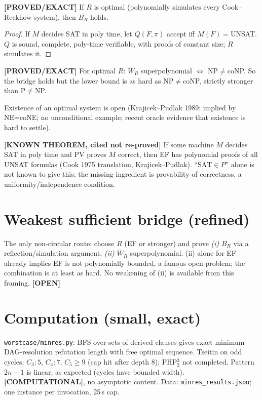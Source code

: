 \documentclass[11pt]{article}
\newcommand{\SAT}{\mathrm{SAT}}\newcommand{\status}[1]{\textbf{[#1]}}
\begin{document}
\begin{proposition} \status{PROVED/EXACT}
If $R$ is optimal (polynomially simulates every Cook--Reckhow system), then $B_R$ holds.
\end{proposition}
\begin{proof} If $M$ decides SAT in poly time, let $Q(F,\pi)$ accept iff $M(F)=$UNSAT. $Q$ is sound, complete, poly-time verifiable, with proofs of constant size; $R$ simulates it. \end{proof}
\begin{proposition} \status{PROVED/EXACT}
For optimal $R$: $\overline W_R$ superpolynomial $\iff$ NP$\ne$coNP. So the bridge holds but the lower bound is as hard as NP$\neq$coNP, strictly stronger than P$\ne$NP.
\end{proposition}
Existence of an optimal system is open (Krajicek--Pudlak 1989: implied by NE=coNE; no unconditional example; recent oracle evidence that existence is hard to settle).

\begin{proposition} \status{KNOWN THEOREM, cited not re-proved}
If some machine $M$ decides SAT in poly time and PV proves $M$ correct, then EF has polynomial proofs of all UNSAT formulas (Cook 1975 translation, Krajicek--Pudlak). ``$\SAT\in P$'' alone is not known to give this; the missing ingredient is provability of correctness, a uniformity/independence condition.
\end{proposition}

\section*{Weakest sufficient bridge (refined)}
The only non-circular route: choose $R$ (EF or stronger) and prove \emph{(i)} $B_R$ via a reflection/simulation argument, \emph{(ii)} $\overline W_R$ superpolynomial. (ii) alone for EF already implies EF is not polynomially bounded, a famous open problem; the combination is at least as hard. No weakening of (ii) is available from this framing. \status{OPEN}

\section*{Computation (small, exact)}
\texttt{worstcase/minres.py}: BFS over sets of derived clauses gives exact minimum DAG-resolution refutation length with free optimal sequence. Tseitin on odd cycles: $C_3\!:5$, $C_4\!:7$, $C_5\ge 9$ (cap hit after depth 8); PHP$_2^3$ not completed. Pattern $2n-1$ is linear, as expected (cycles have bounded width). \status{COMPUTATIONAL}, no asymptotic content. Data: \texttt{minres\_results.json}; one instance per invocation, 25\,s cap.
\end{document}
